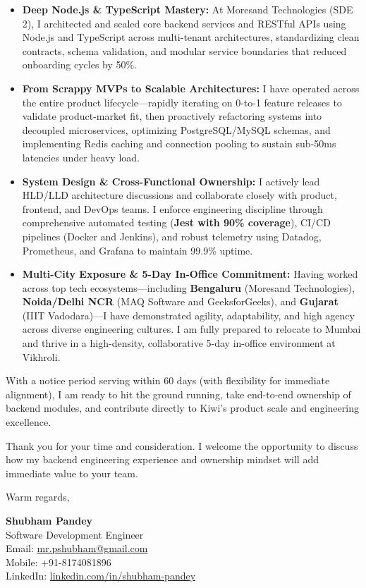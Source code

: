 \documentclass[a4paper,10pt]{article}
\begin{document}
\begin{itemize}[leftmargin=12pt, itemsep=4pt, parsep=0pt]
  \item \textbf{Deep Node.js \& TypeScript Mastery:} At Moresand Technologies (SDE 2), I architected and scaled core backend services and RESTful APIs using Node.js and TypeScript across multi-tenant architectures, standardizing clean contracts, schema validation, and modular service boundaries that reduced onboarding cycles by 50\%.
  \item \textbf{From Scrappy MVPs to Scalable Architectures:} I have operated across the entire product lifecycle—rapidly iterating on 0-to-1 feature releases to validate product-market fit, then proactively refactoring systems into decoupled microservices, optimizing PostgreSQL/MySQL schemas, and implementing Redis caching and connection pooling to sustain sub-50ms latencies under heavy load.
  \item \textbf{System Design \& Cross-Functional Ownership:} I actively lead HLD/LLD architecture discussions and collaborate closely with product, frontend, and DevOps teams. I enforce engineering discipline through comprehensive automated testing (\textbf{Jest with 90\% coverage}), CI/CD pipelines (Docker and Jenkins), and robust telemetry using Datadog, Prometheus, and Grafana to maintain 99.9\% uptime.
  \item \textbf{Multi-City Exposure \& 5-Day In-Office Commitment:} Having worked across top tech ecosystems—including \textbf{Bengaluru} (Moresand Technologies), \textbf{Noida/Delhi NCR} (MAQ Software and GeeksforGeeks), and \textbf{Gujarat} (IIIT Vadodara)—I have demonstrated agility, adaptability, and high agency across diverse engineering cultures. I am fully prepared to relocate to Mumbai and thrive in a high-density, collaborative 5-day in-office environment at Vikhroli.
\end{itemize}

\vspace{6pt}
With a notice period serving within 60 days (with flexibility for immediate alignment), I am ready to hit the ground running, take end-to-end ownership of backend modules, and contribute directly to Kiwi's product scale and engineering excellence.

\vspace{6pt}
Thank you for your time and consideration. I welcome the opportunity to discuss how my backend engineering experience and ownership mindset will add immediate value to your team.

\vspace{12pt}
Warm regards,

\vspace{6pt}
\textbf{Shubham Pandey} \\
Software Development Engineer \\
Email: \href{mailto:mr.pshubham@gmail.com}{mr.pshubham@gmail.com} \\
Mobile: +91-8174081896 \\
LinkedIn: \href{https://www.linkedin.com/in/shubham-pandey-a74716199/}{linkedin.com/in/shubham-pandey}
\end{document}

